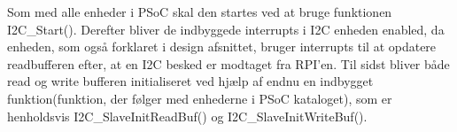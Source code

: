 \documentclass[Softwaredesign/Softwaredesign_main.tex]{subfiles}
\begin{document}
Som med alle enheder i PSoC skal den startes ved at bruge funktionen I2C\_Start(). Derefter bliver de indbyggede interrupts i I2C enheden enabled, da enheden, som også forklaret i design afsnittet, bruger interrupts til at opdatere readbufferen efter, at en I2C besked er modtaget fra RPI'en. Til sidst bliver både read og write bufferen initialiseret ved hjælp af endnu en indbygget funktion(funktion, der følger med enhederne i PSoC kataloget), som er henholdsvis I2C\_SlaveInitReadBuf() og I2C\_SlaveInitWriteBuf(). 
\end{document}
